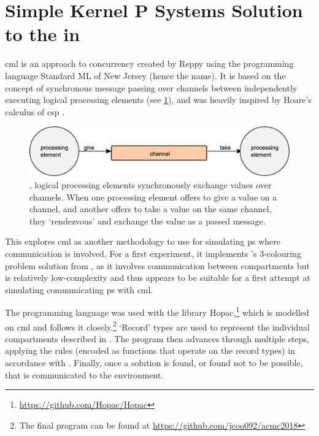 \section[Simple Kernel P Systems Solution to the \glsfmtname{gcp-glossary} in \glsfmtname{cml-glossary}][\Gls{skps} Solution to the \gls{gcp} in \gls{cml}]{\label{sec:gcol:cml}Simple Kernel P Systems Solution to the  in }
\Gls{cml} is an approach to concurrency created by Reppy \cite{Reppy1991} using the programming language Standard ML of New Jersey (hence the name).  It is based on the concept of synchronous message passing over channels between independently executing logical processing elements \cite{Panangaden1997} (see \cref{fig:gcol:cml_exchange}), and was heavily inspired by Hoare's calculus of \gls{csp} \cite{Hoare1985}.

\begin{figure}
    \centering
    \includegraphics[width=\textwidth]{chapters/gcol/figs/cml_exchange.eps}
    \caption[Diagram of the message-passing primitive in ]{, logical processing elements synchronously exchange values over channels.  When one processing element offers to give a value on a channel, and another offers to take a value on the same channel, they ‘rendezvous’ and exchange the value as a passed message.}
    \label{fig:gcol:cml_exchange}
\end{figure}

This  explores \gls{cml} as another methodology to use for simulating \gls{ps} where communication is involved.  For a first experiment, it implements \citeauthor{Gheorghe2013}'s 3-colouring problem solution from \cite{Gheorghe2013}, as it involves communication between compartments but is relatively low-complexity and thus appears to be suitable for a first attempt at simulating communicating \gls{ps} with \gls{cml}.

The programming language \fsharp{} was used with the library Hopac,\footnote{\url{https://github.com/Hopac/Hopac}} which is modelled on \gls{cml} and follows it closely.\footnote{The final program can be found at \url{https://github.com/jcoo092/acmc2018}}  `Record' types are used to represent the individual compartments described in \cite{Gheorghe2013}.  The program then advances through multiple steps, applying the rules (encoded as functions that operate on the record types) in accordance with \cite{Gheorghe2013}.  Finally, once a solution is found, or found not to be possible, that is communicated to the environment.

